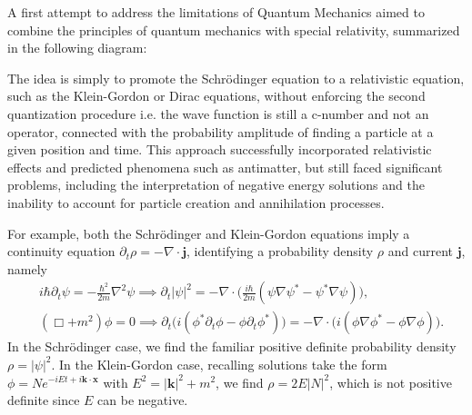 \documentclass[../QFT_main.tex]{subfiles}
\begin{document}
\begin{mytheorem}
%
A first attempt to address the limitations of Quantum Mechanics aimed to combine the principles of quantum mechanics with special relativity, summarized in the following diagram:
\begin{center}
\end{center}
The idea is simply to promote the Schr\"odinger equation to a relativistic equation, such as the Klein-Gordon or Dirac equations, without enforcing the second quantization procedure i.e. the wave function is still a c-number and not an operator, connected with the probability amplitude of finding a particle at a given position and time.
This approach successfully incorporated relativistic effects and predicted phenomena such as antimatter, but still faced significant problems, including the interpretation of negative energy solutions and the inability to account for particle creation and annihilation processes.

For example, both the Schr\"odinger and Klein-Gordon equations imply a continuity equation {\small $\partial_t\rho=-\nabla\cdot \mathbf{j}$}, identifying a probability density $\rho$ and current $\mathbf{j}$, namely
\begin{align}
    &i\hbar \partial_t \psi = -\frac{\hbar^2}{2m} \nabla^2 \psi \implies
    \partial_t|\psi|^2 = -\nabla\cdot \Big(\tfrac{i\hbar}{2m}(\psi \nabla \psi^*- \psi^* \nabla \psi)\Big),
    \\[3pt]
    &(\Box+m^2)\phi = 0 \implies \partial_t\Big(i(\phi^* \partial_t \phi - \phi \partial_t \phi^*)\Big) = -\nabla\cdot \Big(i(\phi \nabla \phi^* - \phi \nabla \phi)\Big).
\end{align}
In the Schr\"odinger case, we find the familiar positive definite probability density $\rho = |\psi|^2$.
In the Klein-Gordon case, recalling solutions take the form {\small $\phi=N e^{-iEt+i\mathbf{k}\cdot \mathbf{x}}$} with {\small $E^2 = |\mathbf{k}|^2 + m^2$}, we find $\rho = 2E|N|^2$, which is not positive definite since $E$ can be negative.


\end{mytheorem}
\end{document}
